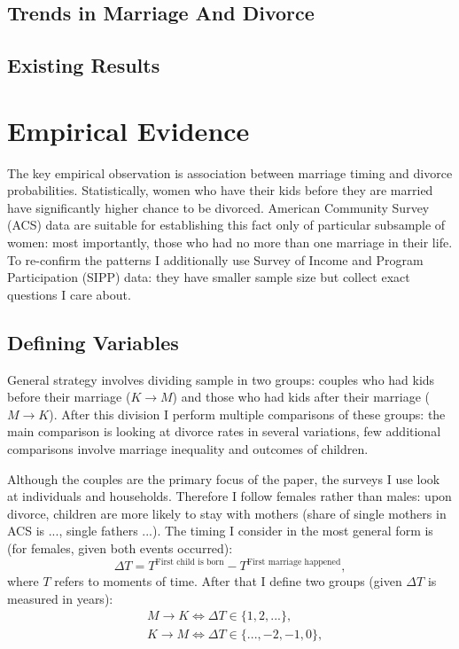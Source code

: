 \documentclass[12pt,letter]{article}
\begin{document}
\subsection{Trends in Marriage And Divorce}


\subsection{Existing Results}


\section{Empirical Evidence}
The key empirical observation is association between marriage timing and divorce probabilities. Statistically, women who have their kids before they are married have significantly higher chance to be divorced. American Community Survey (ACS) data are suitable for establishing this fact only of particular subsample of women: most importantly, those who had no more than one marriage in their life. To re-confirm the patterns I additionally use Survey of Income and Program Participation (SIPP) data: they have smaller sample size but collect exact questions I care about.

\subsection{Defining Variables}

General strategy involves dividing sample in two groups: couples who had kids before their marriage ($K\to M$) and those who had kids after their marriage ($M\to K$). After this division I perform multiple comparisons of these groups: the main comparison is looking at divorce rates in several variations, few additional comparisons involve marriage inequality and outcomes of children.

Although the couples are the primary focus of the paper, the surveys I use look at individuals and households. Therefore I follow females rather than males: upon divorce, children are more likely to stay with mothers (share of single mothers in ACS is ..., single fathers ...). The timing I consider in the  most general form is (for females, given both events occurred): 
\[\Delta T = T^{\text{First child  is born}} - T^{\text{First marriage happened}},\]
where $T$ refers to moments of time. After that I define two groups (given $\Delta T$ is measured in years):
\begin{align*}&M\to K \Leftrightarrow \Delta T \in \{1,2,...\},\\
&K\to M \Leftrightarrow \Delta T \in \{...,-2,-1,0\},\end{align*}
\end{document}
